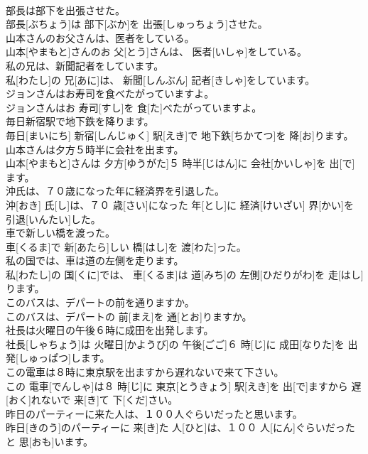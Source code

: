 \documentclass[8pt]{extreport}
\begin{document}
\begin{CJK}{UTF8}{min}
\\	部長は部下を出張させた。	
\\	部長[ぶちょう]は 部下[ぶか]を 出張[しゅっちょう]させた。	
\\	山本さんのお父さんは、医者をしている。	
\\	山本[やまもと]さんのお 父[とう]さんは、 医者[いしゃ]をしている。	
\\	私の兄は、新聞記者をしています。	
\\	私[わたし]の 兄[あに]は、 新聞[しんぶん] 記者[きしゃ]をしています。	
\\	ジョンさんはお寿司を食べたがっていますよ。	
\\	ジョンさんはお 寿司[すし]を 食[た]べたがっていますよ。	
\\	毎日新宿駅で地下鉄を降ります。	
\\	毎日[まいにち] 新宿[しんじゅく] 駅[えき]で 地下鉄[ちかてつ]を 降[お]ります。	
\\	山本さんは夕方５時半に会社を出ます。	
\\	山本[やまもと]さんは 夕方[ゆうがた]５ 時半[じはん]に 会社[かいしゃ]を 出[で]ます。	
\\	沖氏は、７０歳になった年に経済界を引退した。	
\\	沖[おき] 氏[し]は、７０ 歳[さい]になった 年[とし]に 経済[けいざい] 界[かい]を 引退[いんたい]した。	
\\	車で新しい橋を渡った。	
\\	車[くるま]で 新[あたら]しい 橋[はし]を 渡[わた]った。	
\\	私の国では、車は道の左側を走ります。	
\\	私[わたし]の 国[くに]では、 車[くるま]は 道[みち]の 左側[ひだりがわ]を 走[はし]ります。	
\\	このバスは、デパートの前を通りますか。	
\\	このバスは、デパートの 前[まえ]を 通[とお]りますか。	
\\	社長は火曜日の午後６時に成田を出発します。	
\\	社長[しゃちょう]は 火曜日[かようび]の 午後[ごご]６ 時[じ]に 成田[なりた]を 出発[しゅっぱつ]します。	
\\	この電車は８時に東京駅を出ますから遅れないで来て下さい。	
\\	この 電車[でんしゃ]は８ 時[じ]に 東京[とうきょう] 駅[えき]を 出[で]ますから 遅[おく]れないで 来[き]て 下[くだ]さい。	
\\	昨日のパーティーに来た人は、１００人ぐらいだったと思います。	
\\	昨日[きのう]のパーティーに 来[き]た 人[ひと]は、１００ 人[にん]ぐらいだったと 思[おも]います。	

\end{CJK}
\end{document}
